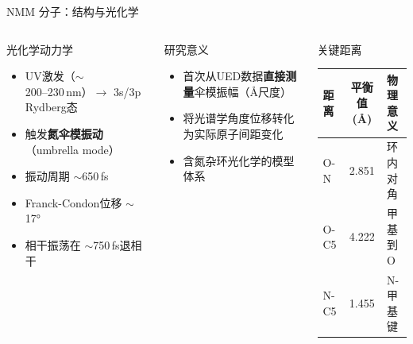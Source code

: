 \documentclass[aspectratio=169,9pt]{beamer}
\begin{document}
\begin{frame}{NMM 分子：结构与光化学}
\begin{columns}[T]
    \begin{block}{光化学动力学}
      \scriptsize
      \begin{itemize}
        \item UV激发（$\sim$200--230\,nm）$\to$ 3s/3p Rydberg态
        \item 触发\textbf{氮伞模振动}（umbrella mode）
        \item 振动周期 $\sim$650\,fs
        \item Franck-Condon位移 $\sim$17°
        \item 相干振荡在 $\sim$750\,fs退相干
      \end{itemize}
    \end{block}

    \begin{exampleblock}{研究意义}
      \scriptsize
      \begin{itemize}
        \item 首次从UED数据\textbf{直接测量}伞模振幅（\AA 尺度）
        \item 将光谱学角度位移转化为实际原子间距变化
        \item 含氮杂环光化学的模型体系
      \end{itemize}
    \end{exampleblock}

    \begin{alertblock}{关键距离}
      \scriptsize
      \renewcommand{\arraystretch}{1.05}
      \begin{tabular}{@{}lcl@{}}
        \toprule
        距离 & 平衡值(\AA) & 物理意义 \\
        \midrule
        O-N & 2.851 & 环内对角 \\
        O-C5 & 4.222 & 甲基到O \\
        N-C5 & 1.455 & N-甲基键 \\
        \bottomrule
      \end{tabular}
    \end{alertblock}
  \end{columns}
\end{frame}
\end{document}
